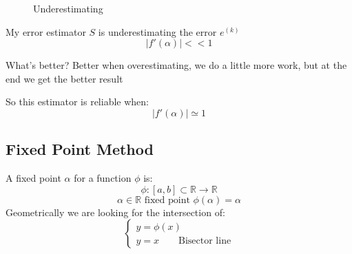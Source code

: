 \begin{figure}[!ht]
    \begin{minipage}{\linewidth}
        \centering
        \caption{Underestimating}
    \end{minipage}
\end{figure}
My error estimator $S$ is underestimating the error $e^{(k)}$
$$|f'(\alpha)| << 1$$

What's better? Better when overestimating, we do a little more work, but at the end we get the better result

So this estimator is reliable when:
$$|f'(\alpha)| \simeq 1$$

\subsection{Fixed Point Method}
A fixed point $\alpha$ for a function $\phi$ is:
$$\phi:[a,b]\subset\mathbb{R}\rightarrow \mathbb{R}$$
$$\alpha\in\mathbb{R}\text{ fixed point $\phi(\alpha)=\alpha$}$$
Geometrically we are looking for the intersection of:
$$
\begin{cases}
    y=\phi(x)\\
    y=x\qquad\text{Bisector line}
\end{cases}
$$

\begin{figure}[!ht]
    \begin{minipage}{\linewidth}
        \centering
    \end{minipage}
\end{figure}

